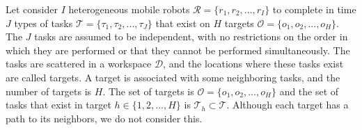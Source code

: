 \documentclass[]{interact}
\theoremstyle{plain}%
\theoremstyle{definition}
\theoremstyle{remark}
\begin{document}
Let consider $I$ heterogeneous mobile robots $\mathcal{R}=\{r_1,r_2,...,r_I\}$ to complete in time $J$ types of tasks $\mathcal{T}=\{\tau_1,\tau_2,...,\tau_J\}$ that exist on $H$ targets $\mathcal{O}=\{o_1,o_2,...,o_H\}$.
The $J$ tasks are assumed to be independent, with no restrictions on the order in which they are performed or that they cannot be performed simultaneously.
The tasks are scattered in a workspace $\mathcal{D}$, and the locations where these tasks exist are called targets. 
A target is associated with some neighboring tasks, and the number of targets is $H$. 
The set of targets is $\mathcal{O} = \{o_1,o_2,...,o_H\}$ and the set of tasks that exist in target $h\in\{1,2,...,H\}$ is $\mathcal{T}_h\subset \mathcal{T}$. 
Although each target has a path to its neighbors, we do not consider this.
\end{document}

